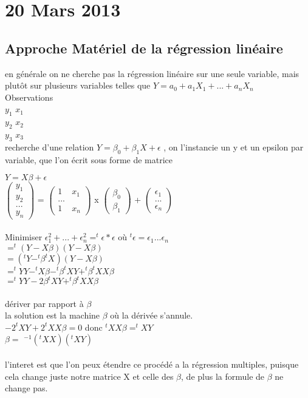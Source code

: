 \documentclass{article}
\begin{document}
\section{20 Mars 2013}
\subsection{Approche Matériel de la régression linéaire} en générale on ne cherche pas la régression linéaire sur une seule variable, mais plutôt sur plusieurs variables telles que $Y= a_0+a_1X_1+...+a_nX_n$\\Observations \\$y_1$ $x_1$\\$y_2$ $x_2$\\$y_3$ $x_3$\\recherche d'une relation $Y=\beta_0 + \beta_1X+\epsilon$ , on l'instancie un y et un epsilon par variable, que l'on écrit sous forme de matrice\\
\begin{center}

$ Y=X\beta+\epsilon $\\
$\begin{pmatrix}
 y_1\\
 y_2\\
 ...\\
 y_n
\end{pmatrix}$  = $\begin{pmatrix}
1 & x_1 \\
... \\
1 & x_n
\end{pmatrix}$ x $\begin{pmatrix}
\beta_0 \\ \beta_1
\end{pmatrix}$ + 
$\begin{pmatrix}
\epsilon_1 \\
... \\
\epsilon_n
\end{pmatrix}$
\end{center}

\newpage
\paragraph{} Minimiser $\epsilon_1^2 + ... + \epsilon_n^2 = ^t \epsilon * \epsilon$  où $^t \epsilon = \epsilon_1 ...\epsilon_n$\\$= ^t(Y-X\beta)(Y-X\beta)$\\$=(^tY-^t\beta^tX)(Y-X\beta)$\\$=^tYY-^tX\beta-^t\beta^tXY+^t\beta^tXX\beta$\\$=^tYY-2\beta^tXY+^t\beta^tXX\beta$\\\\dériver par rapport à $\beta$\\la solution est la machine $\beta$ où la dérivée s'annule.\\$-2^tXY+2^tXX\beta = 0$ donc $^tXX\beta = ^tXY$\\$\beta = $ $^{-1}(^tXX)(^tXY)$ \\\\ l'interet est que l'on peux étendre ce procédé a la régression multiples, puisque cela change juste notre matrice X et celle des $\beta$, de plus la formule de $\beta$  ne change pas.
\end{document}
